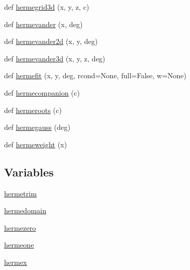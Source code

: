 \begin{DoxyCompactItemize}
\item 
def \hyperlink{namespacenumpy_1_1polynomial_1_1hermite__e_abe4a0db8e1ee92773aa35ad8b9599546}{hermegrid3d} (x, y, z, c)
\item 
def \hyperlink{namespacenumpy_1_1polynomial_1_1hermite__e_afd2be39cbb6a5bf5c4050c36d17102a6}{hermevander} (x, deg)
\item 
def \hyperlink{namespacenumpy_1_1polynomial_1_1hermite__e_afb0e7245b51ef3a40a800c85525fca8b}{hermevander2d} (x, y, deg)
\item 
def \hyperlink{namespacenumpy_1_1polynomial_1_1hermite__e_a9319ebd8c816790ac8682a3861dc0e6a}{hermevander3d} (x, y, z, deg)
\item 
def \hyperlink{namespacenumpy_1_1polynomial_1_1hermite__e_a7ecee17361686a74c851e9014b5a9f64}{hermefit} (x, y, deg, rcond=None, full=False, w=None)
\item 
def \hyperlink{namespacenumpy_1_1polynomial_1_1hermite__e_a1cd306ca9c16a0f21e7c06b365316b34}{hermecompanion} (c)
\item 
def \hyperlink{namespacenumpy_1_1polynomial_1_1hermite__e_add2d39c957e8508d0f99e0fc9738684b}{hermeroots} (c)
\item 
def \hyperlink{namespacenumpy_1_1polynomial_1_1hermite__e_ad223b7669c06c32f7fce538a81f6301b}{hermegauss} (deg)
\item 
def \hyperlink{namespacenumpy_1_1polynomial_1_1hermite__e_a95c6dd64af2da97fc03d65fc83a7ad29}{hermeweight} (x)
\end{DoxyCompactItemize}
\subsection*{Variables}
\begin{DoxyCompactItemize}
\item 
\hyperlink{namespacenumpy_1_1polynomial_1_1hermite__e_a17dce574fc4862ecf83d8368732d60a2}{hermetrim}
\item 
\hyperlink{namespacenumpy_1_1polynomial_1_1hermite__e_a6cb51e2b612fa5954bbc0fed8cf1bdf1}{hermedomain}
\item 
\hyperlink{namespacenumpy_1_1polynomial_1_1hermite__e_aafa90654cef3a787ed18fc507e94e3d1}{hermezero}
\item 
\hyperlink{namespacenumpy_1_1polynomial_1_1hermite__e_aac15baa19e3d9a3aa5c3b6096b38e28b}{hermeone}
\item 
\hyperlink{namespacenumpy_1_1polynomial_1_1hermite__e_aed0ffc6dae3dda3a6a65aa000f365463}{hermex}
\end{DoxyCompactItemize}


